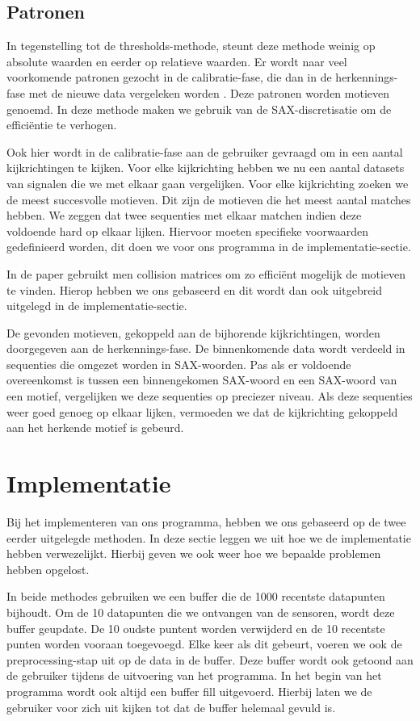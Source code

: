 \documentclass{article}
\begin{document}
\subsection{Patronen}

In tegenstelling tot de thresholds-methode, steunt deze methode weinig op absolute waarden en eerder op relatieve waarden. Er wordt naar veel voorkomende patronen gezocht in de calibratie-fase, die dan in de herkennings-fase met de nieuwe data vergeleken worden \cite{motifs}. Deze patronen worden motieven genoemd. In deze methode maken we gebruik van de SAX-discretisatie om de efficiëntie te verhogen.

Ook hier wordt in de calibratie-fase aan de gebruiker gevraagd om in een aantal kijkrichtingen te kijken. Voor elke kijkrichting hebben we nu een aantal datasets van signalen die we met elkaar gaan vergelijken. Voor elke kijkrichting zoeken we de meest succesvolle motieven. Dit zijn de motieven die het meest aantal matches hebben. We zeggen dat twee sequenties met elkaar matchen indien deze voldoende hard op elkaar lijken. Hiervoor moeten specifieke voorwaarden gedefinieerd worden, dit doen we voor ons programma in de implementatie-sectie.

In de paper \cite{motifs} gebruikt men collision matrices om zo efficiënt mogelijk de motieven te vinden. Hierop hebben we ons gebaseerd en dit wordt dan ook uitgebreid uitgelegd in de implementatie-sectie.

De gevonden motieven, gekoppeld aan de bijhorende kijkrichtingen, worden doorgegeven aan de herkennings-fase. De binnenkomende data wordt verdeeld in sequenties die omgezet worden in SAX-woorden. Pas als er voldoende overeenkomst is tussen een binnengekomen SAX-woord en een SAX-woord van een motief, vergelijken we deze sequenties op preciezer niveau. Als deze sequenties weer goed genoeg op elkaar lijken, vermoeden we dat de kijkrichting gekoppeld aan het herkende motief is gebeurd.

\section{Implementatie}

Bij het implementeren van ons programma, hebben we ons gebaseerd op de twee eerder uitgelegde methoden. In deze sectie leggen we uit hoe we de implementatie hebben verwezelijkt. Hierbij geven we ook weer hoe we bepaalde problemen hebben opgelost.

In beide methodes gebruiken we een buffer die de 1000 recentste datapunten bijhoudt. Om de 10 datapunten die we ontvangen van de sensoren, wordt deze buffer geupdate. De 10 oudste puntent worden verwijderd en de 10 recentste punten worden vooraan toegevoegd. Elke keer als dit gebeurt, voeren we ook de preprocessing-stap uit op de data in de buffer. Deze buffer wordt ook getoond aan de gebruiker tijdens de uitvoering van het programma. In het begin van het programma wordt ook altijd een buffer fill uitgevoerd. Hierbij laten we de gebruiker voor zich uit kijken tot dat de buffer helemaal gevuld is.
\end{document}
